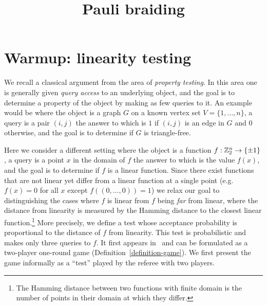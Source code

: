 




\title{Pauli braiding}
\label{paulibraiding}

\maketitle

\label{section-phantom}

\tableofcontents

\section{Warmup: linearity testing}
\label{section-linearity-testing}

We recall a classical argument from the area of \emph{property testing}. In this area one is generally given \emph{query access} to an underlying object, and the goal is to determine a property of the object by making as few queries to it. An example would be where the object is a graph $G$ on a known vertex set $V = \{1,\ldots, n\}$, a query is a pair $(i,j)$ the answer to which is $1$ if $(i,j)$ is an edge in $G$ and $0$ otherwise, and the goal is to determine if $G$ is triangle-free. 

Here we consider a different setting where the object is a function $f:\mathbb{Z}_2^n\to\{\pm1 \}$, a query is a point $x$ in the domain of $f$ the answer to which is the value $f(x)$, and the goal is to determine if $f$ is a linear function. Since there exist functions that are not linear yet differ from a linear function at a single point (e.g.\ $f(x)=0$ for all $x$ except $f((0,\ldots,0))=1$) we relax our goal to distinguishing the cases where $f$ is linear from $f$ being \emph{far} from linear, where the distance from linearity is measured by the Hamming distance to the closest linear function.\footnote{The Hamming distance between two functions with finite domain is the number of points in their domain at which they differ.} More precisely, we define a test whose acceptance probability is proportional to the distance of $f$ from linearity. This test is probabilistic and makes only three queries to $f$. It first appears in~\cite{blum1993self} and can be formulated as a two-player one-round game (Definition~\ref{definition-game}). We first present the game informally as a ``test'' played by the referee with two players.  

